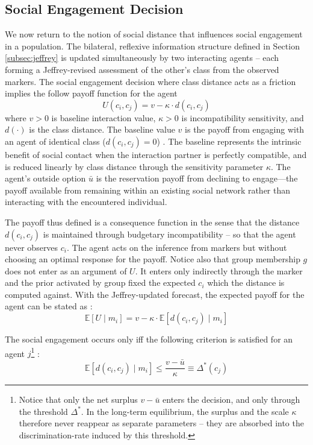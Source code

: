 \documentclass[pdflatex,sn-basic]{sn-jnl}
\newcommand{\E}{\mathbb{E}}
\theoremstyle{thmstyleone}
\numberwithin{proposition}{subsection}
\begin{document}
\subsection{Social Engagement Decision} 
\label{subsec:social_engagement}
We now return to the notion of social distance that influences social engagement in a population. The bilateral, reflexive information structure defined in Section \ref{subsec:jeffrey} is updated simultaneously by two interacting agents -- each forming a Jeffrey-revised assessment of the other's class from the observed markers. The social engagement decision where class distance acts as a friction implies the follow payoff function for the agent 
\begin{equation}
  U(c_i, c_j) = v - \kappa \cdot d(c_i, c_j)
  \label{eq:utility}
\end{equation}
where $v > 0$ is baseline interaction value, $\kappa > 0$ is
incompatibility sensitivity, and $d(\cdot)$ is the class distance.
The baseline value $v$ is the payoff from engaging with an agent of
identical class ($d(c_i, c_j) = 0$) . The baseline represents the intrinsic
benefit of social contact when the interaction partner is perfectly
compatible, and is reduced linearly by class distance through the
sensitivity parameter $\kappa$.
The agent's outside option $\bar{u}$ is the reservation payoff from
declining to engage---the payoff available from remaining within an
existing social network rather than interacting with the encountered
individual. 

The payoff thus defined is a consequence function in the sense that the distance
$d(c_i,c_j)$ is maintained through budgetary incompatibility -- so that the agent never
observes $c_i$. The agent acts on the inference from markers but without choosing an optimal response for the payoff. Notice also that group membership $g$ does not enter as an argument of $U$. It enters only indirectly through the marker and the prior activated by group fixed the expected $c_i$ which the distance is computed against. With the Jeffrey-updated forecast, the expected payoff for the agent can be stated as :
\begin{equation}
  \E[U \mid m_i] = v - \kappa \cdot \E[d(c_i, c_j) \mid m_i]
  \label{eq:exp-utility}
\end{equation}

The social engagement occurs only iff the following criterion is satisfied for an agent $j$\footnote{Notice that only the net surplus $v - \bar{u}$ enters the decision, and only through
the threshold $\Delta^*$. In the long-term equilibrium, the surplus and the scale $\kappa$ therefore never
reappear as separate parameters --  they are absorbed into the
discrimination-rate induced by this threshold. }  :
\begin{equation}
  \E[d(c_i, c_j) \mid m_i] \leq
  \frac{v - \bar{u}}{\kappa} \equiv \Delta^*(c_j)
  \label{eq:threshold}
\end{equation}
\end{document}
